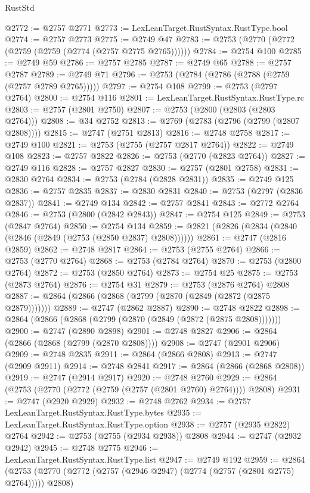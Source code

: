 \begin{lexlean}{RustStd}
\begin{coremodule}
@2772 := @2757 @2771
@2773 := LexLeanTarget.RustSyntax.RustType.bool
@2774 := @2757 @2773
@2775 := @2749 @47
@2783 := @2753 (@2770 (@2772 (@2759 (@2759 (@2774 (@2757 @2775 @2765))))))
@2784 := @2754 @100
@2785 := @2749 @59
@2786 := @2757 @2785
@2787 := @2749 @65
@2788 := @2757 @2787
@2789 := @2749 @71
@2796 := @2753 (@2784 (@2786 (@2788 (@2759 (@2757 @2789 @2765)))))
@2797 := @2754 @108
@2799 := @2753 (@2797 @2764)
@2800 := @2754 @116
@2801 := LexLeanTarget.RustSyntax.RustType.rc
@2803 := @2757 (@2801 @2750)
@2807 := @2753 (@2800 (@2803 (@2803 @2764)))
@2808 := @34 @2752
@2813 := @2769 (@2783 (@2796 (@2799 (@2807 @2808))))
@2815 := @2747 (@2751 @2813)
@2816 := @2748 @2758
@2817 := @2749 @100
@2821 := @2753 (@2755 (@2757 @2817 @2764))
@2822 := @2749 @108
@2823 := @2757 @2822
@2826 := @2753 (@2770 (@2823 @2764))
@2827 := @2749 @116
@2828 := @2757 @2827
@2830 := @2757 (@2801 @2758)
@2831 := @2830 @2764
@2834 := @2753 (@2784 (@2828 @2831))
@2835 := @2749 @125
@2836 := @2757 @2835
@2837 := @2830 @2831
@2840 := @2753 (@2797 (@2836 @2837))
@2841 := @2749 @134
@2842 := @2757 @2841
@2843 := @2772 @2764
@2846 := @2753 (@2800 (@2842 @2843))
@2847 := @2754 @125
@2849 := @2753 (@2847 @2764)
@2850 := @2754 @134
@2859 := @2821 (@2826 (@2834 (@2840 (@2846 (@2849 (@2753 (@2850 @2837) @2808))))))
@2861 := @2747 (@2816 @2859)
@2862 := @2748 @2817
@2864 := @2753 (@2755 @2764)
@2866 := @2753 (@2770 @2764)
@2868 := @2753 (@2784 @2764)
@2870 := @2753 (@2800 @2764)
@2872 := @2753 (@2850 @2764)
@2873 := @2754 @25
@2875 := @2753 (@2873 @2764)
@2876 := @2754 @31
@2879 := @2753 (@2876 @2764) @2808
@2887 := @2864 (@2866 (@2868 (@2799 (@2870 (@2849 (@2872 (@2875 @2879)))))))
@2889 := @2747 (@2862 @2887)
@2890 := @2748 @2822
@2898 := @2864 (@2866 (@2868 (@2799 (@2870 (@2849 (@2872 (@2875 @2808)))))))
@2900 := @2747 (@2890 @2898)
@2901 := @2748 @2827
@2906 := @2864 (@2866 (@2868 (@2799 (@2870 @2808))))
@2908 := @2747 (@2901 @2906)
@2909 := @2748 @2835
@2911 := @2864 (@2866 @2808)
@2913 := @2747 (@2909 @2911)
@2914 := @2748 @2841
@2917 := @2864 (@2866 (@2868 @2808))
@2919 := @2747 (@2914 @2917)
@2920 := @2748 @2760
@2929 := @2864 (@2753 (@2770 (@2772 (@2759 (@2757 (@2801 @2760) @2764)))) @2808)
@2931 := @2747 (@2920 @2929)
@2932 := @2748 @2762
@2934 := @2757 LexLeanTarget.RustSyntax.RustType.bytes
@2935 := LexLeanTarget.RustSyntax.RustType.option
@2938 := @2757 (@2935 @2822) @2764
@2942 := @2753 (@2755 (@2934 @2938)) @2808
@2944 := @2747 (@2932 @2942)
@2945 := @2748 @2775
@2946 := LexLeanTarget.RustSyntax.RustType.list
@2947 := @2749 @192
@2959 := @2864
    (@2753 (@2770 (@2772 (@2757 (@2946 @2947) (@2774 (@2757 (@2801 @2775) @2764))))) @2808)

\end{coremodule}
\end{lexlean}
